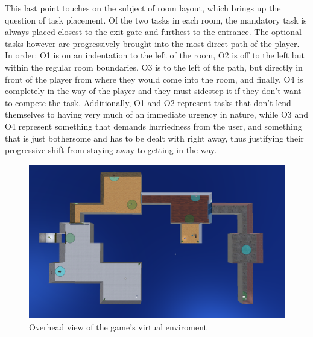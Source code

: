     This last point touches on the subject of room layout, which brings up the question of task placement. Of the two tasks in each room, the mandatory task is always placed closest to the exit gate and furthest to the entrance. The optional tasks however are progressively brought into the most direct path of the player. In order: O1 is on an indentation to the left of the room, O2 is off to the left but within the regular room boundaries, O3 is to the left of the path, but directly in front of the player from where they would come into the room, and finally, O4 is completely in the way of the player and they must sidestep it if they don’t want to compete the task. Additionally, O1 and O2 represent tasks that don’t lend themselves to having very much of an immediate urgency in nature, while O3 and O4 represent something that demands hurriedness from the user, and something that is just bothersome and has to be dealt with right away, thus justifying their progressive shift from staying away to getting in the way.\\
    
    \begin{figure}[ht]
        \centering
        \hspace*{-1cm}
        \includegraphics[width=0.8\paperwidth]{figures/Overhead.png}
        \caption{\label{fig:FigureGameOverhead}Overhead view of the game's virtual enviroment}
    \end{figure}

